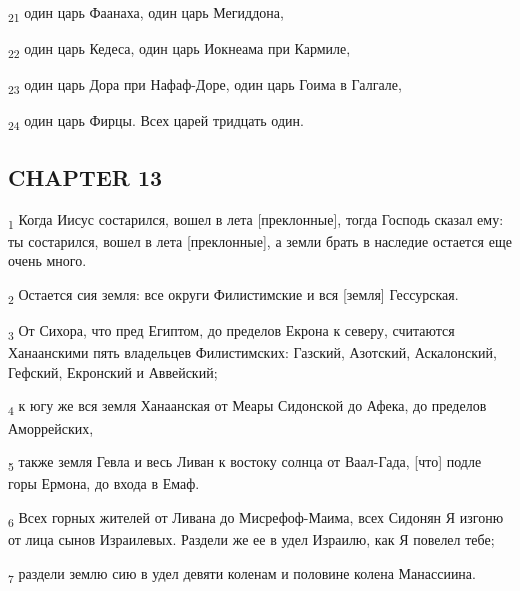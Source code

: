 \begin{tcolorbox}
\textsubscript{21} один царь Фаанаха, один царь Мегиддона,
\end{tcolorbox}
\begin{tcolorbox}
\textsubscript{22} один царь Кедеса, один царь Иокнеама при Кармиле,
\end{tcolorbox}
\begin{tcolorbox}
\textsubscript{23} один царь Дора при Нафаф-Доре, один царь Гоима в Галгале,
\end{tcolorbox}
\begin{tcolorbox}
\textsubscript{24} один царь Фирцы. Всех царей тридцать один.
\end{tcolorbox}
\subsection{CHAPTER 13}
\begin{tcolorbox}
\textsubscript{1} Когда Иисус состарился, вошел в лета [преклонные], тогда Господь сказал ему: ты состарился, вошел в лета [преклонные], а земли брать в наследие остается еще очень много.
\end{tcolorbox}
\begin{tcolorbox}
\textsubscript{2} Остается сия земля: все округи Филистимские и вся [земля] Гессурская.
\end{tcolorbox}
\begin{tcolorbox}
\textsubscript{3} От Сихора, что пред Египтом, до пределов Екрона к северу, считаются Ханаанскими пять владельцев Филистимских: Газский, Азотский, Аскалонский, Гефский, Екронский и Аввейский;
\end{tcolorbox}
\begin{tcolorbox}
\textsubscript{4} к югу же вся земля Ханаанская от Меары Сидонской до Афека, до пределов Аморрейских,
\end{tcolorbox}
\begin{tcolorbox}
\textsubscript{5} также земля Гевла и весь Ливан к востоку солнца от Ваал-Гада, [что] подле горы Ермона, до входа в Емаф.
\end{tcolorbox}
\begin{tcolorbox}
\textsubscript{6} Всех горных жителей от Ливана до Мисрефоф-Маима, всех Сидонян Я изгоню от лица сынов Израилевых. Раздели же ее в удел Израилю, как Я повелел тебе;
\end{tcolorbox}
\begin{tcolorbox}
\textsubscript{7} раздели землю сию в удел девяти коленам и половине колена Манассиина.
\end{tcolorbox}
